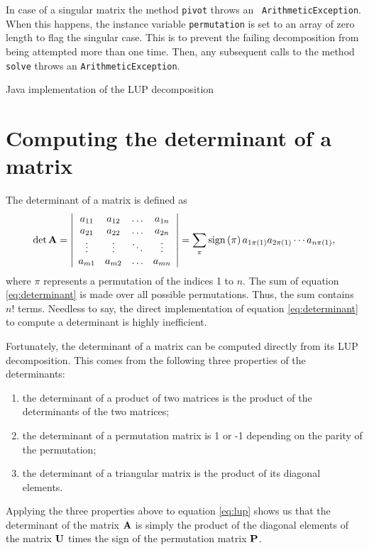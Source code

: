 \documentclass[twoside]{book}
\begin{document}
In case of a singular matrix the method {\tt pivot} throws an {\tt
ArithmeticException}. When this happens, the instance variable
{\tt permutation} is set to an array of zero length to flag the
singular case. This is to prevent the failing decomposition from
being attempted more than one time. Then, any subsequent calls to
the method {\tt solve} throws an {\tt ArithmeticException}.

\begin{listing} Java implementation of the LUP decomposition \label{lj:lup}

\end{listing}

\section{Computing the determinant of a matrix}
\label{sec:determinant} The determinant of a matrix is defined
as
\begin{equation}
\label{eq:determinant}
  \det{\bf A}=\left|
  \begin{array}{cccc}a_{11}& a_{12}&\ldots& a_{1n}\\
  a_{21}& a_{22}&\ldots& a_{2n}\\
  \vdots&\vdots&\ddots&\vdots\\
  a_{m1}& a_{m2}&\ldots& a_{mn}\\ \end{array}
  \right|=\sum_{\pi}\mathop{\rm sign}\left({\pi}\right) a_{1\pi\left(1\right)}a_{2\pi\left(1\right)}
  \cdots a_{n\pi\left(1\right)},
\end{equation}
where $\pi$ represents a permutation of the indices 1 to $n$. The
sum of equation \ref{eq:determinant} is made over all possible
permutations. Thus, the sum contains $n!$ terms. Needless to say,
the direct implementation of equation \ref{eq:determinant} to
compute a determinant is highly inefficient.

Fortunately, the determinant of a matrix can be computed directly
from its LUP decomposition. This comes from the following three
properties of the determinants:
\begin{enumerate}
  \item the determinant of a product of two matrices is the product of the determinants of the two
  matrices;
  \item the determinant of a permutation matrix is 1 or -1 depending on the parity of the
  permutation;
  \item the determinant of a triangular matrix is the product of its diagonal elements.
\end{enumerate}
Applying the three properties above to equation \ref{eq:lup} shows
us that the determinant of the matrix ${\bf A}$ is simply the
product of the diagonal elements of the matrix ${\bf U}$ times the
sign of the permutation matrix ${\bf P}$.
\end{document}

